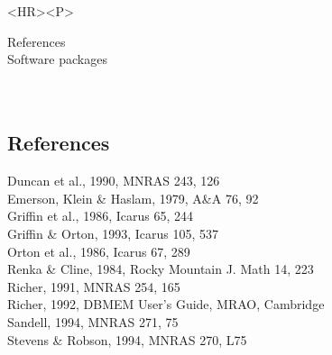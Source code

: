\begin{htmlonly}
\begin{rawhtml} <HR><P> \end{rawhtml}
{\bf {}} References\\
{\bf {}} Software packages\\
{\bf {}}\\
{\bf {}}\\
\end{htmlonly}


\subsection{\label{refer}References}

Duncan et al., 1990, MNRAS 243, 126\\
Emerson, Klein \& Haslam, 1979, A\&A 76, 92\\
Griffin et al., 1986, Icarus  65, 244\\
Griffin \& Orton, 1993, Icarus 105, 537\\
Orton et al., 1986, Icarus 67, 289\\
Renka \& Cline, 1984, Rocky Mountain J. Math 14, 223\\
Richer, 1991, MNRAS 254, 165\\
Richer, 1992, DBMEM User's Guide, MRAO, Cambridge\\
Sandell, 1994, MNRAS 271, 75\\
Stevens \& Robson, 1994, MNRAS 270, L75\\

